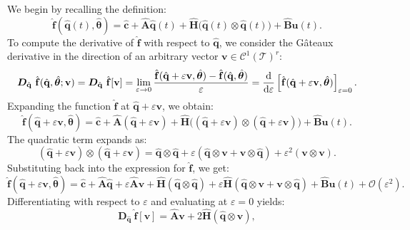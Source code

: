 We begin by recalling the definition:\\
$$
\hat{\mathbf{f}}(\hat{\mathbf{q}}(t), \hat{\bm{\theta}}) = \hat{\mathbf{c}} + \hat{\mathbf{A}}\hat{\mathbf{q}}(t) + \hat{\mathbf{H}}\bigl( \hat{\mathbf{q}}(t)\otimes \hat{\mathbf{q}}(t) \bigr) + \hat{\mathbf{B}}\mathbf{u}(t).
$$
To compute the derivative of $\hat{\mathbf{f}}$ with respect to $\hat{\mathbf{q}}$, we consider the Gâteaux derivative in the direction of an arbitrary vector $\mathbf{v}\in \mathcal{C}^1(\mathcal{T})^r$:\\
$$
\bm{D}_{\hat{\mathbf{q}}}~\hat{\mathbf{f}}(\hat{\mathbf{q}}, \hat{\bm{\theta}}; \mathbf{v}) = \bm{D}_{\hat{\mathbf{q}}}~\hat{\mathbf{f}}[\mathbf{v}] = \lim_{\varepsilon \to 0} \frac{\hat{\mathbf{f}}(\hat{\mathbf{q}} + \varepsilon \mathbf{v}, \hat{\bm{\theta}}) - \hat{\mathbf{f}}(\hat{\mathbf{q}}, \hat{\bm{\theta}})}{\varepsilon} = \dv{}{\varepsilon} \left[ \hat{\mathbf{f}}(\hat{\mathbf{q}} + \varepsilon \mathbf{v}, \hat{\bm{\theta}}) \right]_{\varepsilon = 0}.
$$
Expanding the function $\hat{\mathbf{f}}$ at $\hat{\mathbf{q}} + \varepsilon \mathbf{v}$, we obtain:\\
$$
\hat{\mathbf{f}}(\hat{\mathbf{q}} + \varepsilon \mathbf{v}, \hat{\bm{\theta}}) = \hat{\mathbf{c}} + \hat{\mathbf{A}}(\hat{\mathbf{q}} + \varepsilon \mathbf{v}) + \hat{\mathbf{H}}\bigl( (\hat{\mathbf{q}} + \varepsilon \mathbf{v}) \otimes (\hat{\mathbf{q}} + \varepsilon \mathbf{v}) \bigr) + \hat{\mathbf{B}}\mathbf{u}(t).
$$
The quadratic term expands as:\\
$$
(\hat{\mathbf{q}} + \varepsilon \mathbf{v}) \otimes (\hat{\mathbf{q}} + \varepsilon \mathbf{v}) = \hat{\mathbf{q}} \otimes \hat{\mathbf{q}} + \varepsilon (\hat{\mathbf{q}} \otimes \mathbf{v} + \mathbf{v} \otimes \hat{\mathbf{q}}) + \varepsilon^2 (\mathbf{v} \otimes \mathbf{v}).
$$
Substituting back into the expression for $\hat{\mathbf{f}}$, we get:\\
$$
\hat{\mathbf{f}}(\hat{\mathbf{q}} + \varepsilon \mathbf{v}, \hat{\bm{\theta}}) = \hat{\mathbf{c}} + \hat{\mathbf{A}}\hat{\mathbf{q}} + \varepsilon \hat{\mathbf{A}}\mathbf{v} + \hat{\mathbf{H}}(\hat{\mathbf{q}} \otimes \hat{\mathbf{q}}) + \varepsilon \hat{\mathbf{H}}(\hat{\mathbf{q}} \otimes \mathbf{v} + \mathbf{v} \otimes \hat{\mathbf{q}}) + \hat{\mathbf{B}}\mathbf{u}(t) + \mathcal{O}(\varepsilon^2).
$$
Differentiating with respect to $\varepsilon$ and evaluating at $\varepsilon = 0$ yields:\\
$$
\bm{D}_{\hat{\mathbf{q}}}~\hat{\mathbf{f}}[\mathbf{v}] = \hat{\mathbf{A}}\mathbf{v} + 2\hat{\mathbf{H}}(\hat{\mathbf{q}} \otimes \mathbf{v}),
$$

